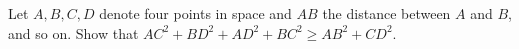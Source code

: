 Let $A, B, C, D$ denote four points in space and $AB$ the distance between $A$ and $B$, and so on. Show that $AC^2 + BD^2 + AD^2 + BC^2 \geq AB^2 + CD^2$.
